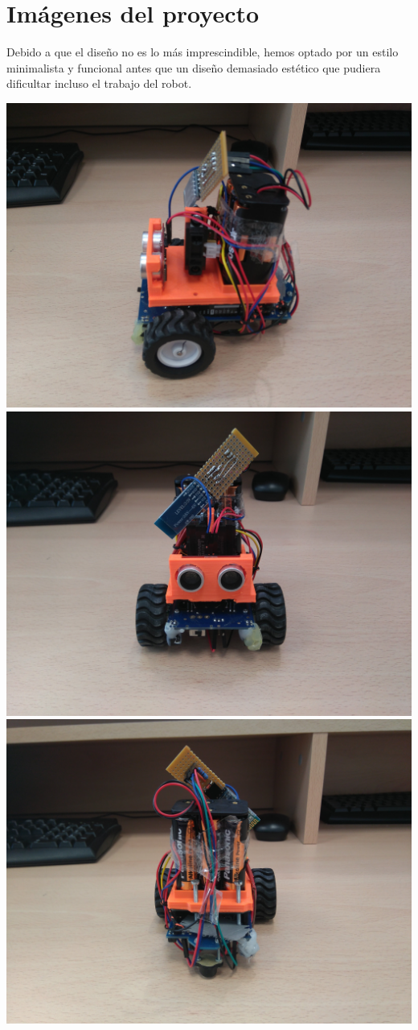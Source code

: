 \section{Imágenes del proyecto}
Debido a que el diseño no es lo más imprescindible, hemos optado por un estilo minimalista y funcional antes que un diseño demasiado estético que pudiera dificultar incluso el trabajo del robot.
\begin{center}
	\includegraphics[scale=0.124]{F1.jpg}
	\includegraphics[scale=0.124]{F2.jpg}
	\includegraphics[scale=0.124]{F3.jpg}

\end{center}
